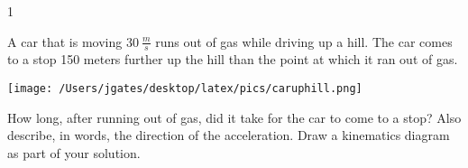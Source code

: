 
\AddToShipoutPicture*{\BackgroundPic}

\addtocounter {ProbNum} {1}

 
{\bf \Large{}} A car that is moving ${30~\tfrac{m}{s}}$ runs out of gas while driving up a hill.  The car comes to a stop 150 meters further up the hill than the point at which it ran out of gas. 

\begin{center}
\texttt{[image: /Users/jgates/desktop/latex/pics/caruphill.png]}
\end{center}

\bigskip  How long, after running out of gas, did it take for the car to come to a stop?  Also describe, in words, the direction of the acceleration. Draw a kinematics diagram as part of your solution.


\vfill
\newpage
